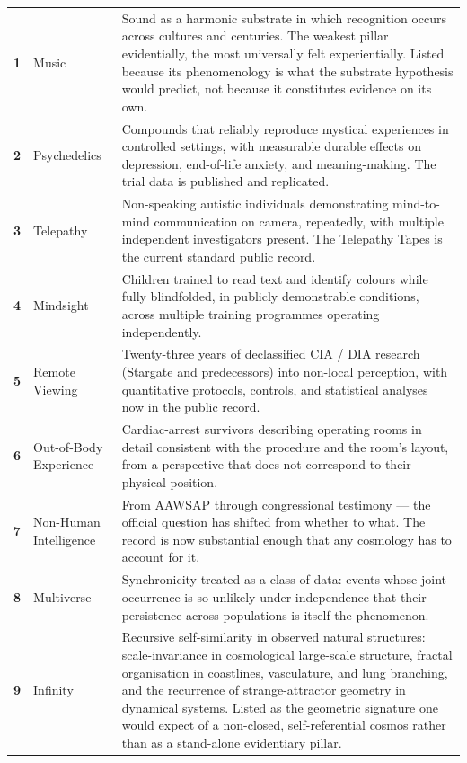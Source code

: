 \documentclass[11pt,a4paper]{article}
\begin{document}
\begin{plainbox}
\begin{tabular}{@{}p{0.4cm} p{4.2cm} p{9cm}@{}}
\textbf{1} & Music                   & Sound as a harmonic substrate in which recognition occurs across cultures and centuries. The weakest pillar evidentially, the most universally felt experientially. Listed because its phenomenology is what the substrate hypothesis would predict, not because it constitutes evidence on its own. \\
\textbf{2} & Psychedelics            & Compounds that reliably reproduce mystical experiences in controlled settings, with measurable durable effects on depression, end-of-life anxiety, and meaning-making. The trial data is published and replicated. \\
\textbf{3} & Telepathy               & Non-speaking autistic individuals demonstrating mind-to-mind communication on camera, repeatedly, with multiple independent investigators present. The Telepathy Tapes is the current standard public record. \\
\textbf{4} & Mindsight               & Children trained to read text and identify colours while fully blindfolded, in publicly demonstrable conditions, across multiple training programmes operating independently. \\
\textbf{5} & Remote Viewing          & Twenty-three years of declassified CIA / DIA research (Stargate and predecessors) into non-local perception, with quantitative protocols, controls, and statistical analyses now in the public record. \\
\textbf{6} & Out-of-Body Experience  & Cardiac-arrest survivors describing operating rooms in detail consistent with the procedure and the room's layout, from a perspective that does not correspond to their physical position. \\
\textbf{7} & Non-Human Intelligence  & From AAWSAP through congressional testimony --- the official question has shifted from whether to what. The record is now substantial enough that any cosmology has to account for it. \\
\textbf{8} & Multiverse              & Synchronicity treated as a class of data: events whose joint occurrence is so unlikely under independence that their persistence across populations is itself the phenomenon. \\
\textbf{9} & Infinity                & Recursive self-similarity in observed natural structures: scale-invariance in cosmological large-scale structure, fractal organisation in coastlines, vasculature, and lung branching, and the recurrence of strange-attractor geometry in dynamical systems. Listed as the geometric signature one would expect of a non-closed, self-referential cosmos rather than as a stand-alone evidentiary pillar. \\
\end{tabular}
\end{plainbox}
\end{document}
